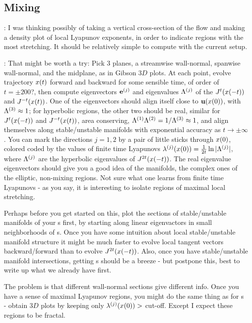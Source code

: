 \subsection{Mixing}
:
I was thinking possibly of taking a vertical cross-section of
the flow and making a density plot of local Lyapunov exponents,
in order to indicate regions with the most stretching.
It should be relatively simple to compute with the current setup.

\medskip
{}:
That might be worth a try: Pick 3 planes, a streamwise wall-normal,
spanwise wall-normal, and the midplane, as in Gibson $3D$ plots.
At each point, evolve trajectory $\ssp(t)$
forward and backward for some sensible time, of order of
$t=\pm 200$?, then compute eigenvectors
$\jEigvec[j]$ and eigenvalues $\ExpaEig^{(j)}$ of the {\jacobianM}
$\jMps^{t}(\ssp(-t))$ and $\jMps^{-t}(\ssp(t))$. One of the
eigenvectors should align itself close to $\bu(\ssp(0))$,
with $\ExpaEig^{(3)} \approx 1$; for hyperbolic regions, the other two should
be real, similar for $\jMps^{t}(\ssp(-t))$ and $\jMps^{-t}(\ssp(t))$,
area conserving,
$\ExpaEig^{(1)}\ExpaEig^{(2)}= 1/\ExpaEig^{(3)} \approx 1$,
and align themselves along stable/unstable manifolds with exponential
accuracy as $t \to \pm \infty$.
You can mark the directions $j=1,2$ by a pair of little sticks
through $\ssp(0)$, colored coded by the values of
finite time Lyapunovs
$\eigExp[j](\ssp(0)) = \frac{1}{2t} \ln |\ExpaEig^{(j)}|$, where
$\ExpaEig^{(j)}$ are the hyperbolic eigenvalues of
$\jMps^{2t}(\ssp(-t))$.
The real  eigenvalue eigenvectors should give you a good idea of
the manifolds, the complex ones of the elliptic, non-mixing regions.
Not sure what one learns from finite time Lyapunovs - as you say,
it is interesting to isolate regions of maximal local stretching.

Perhaps before you get started on this, plot the sections of stable/unstable
manifolds of your \stagp s first, by starting along linear eigenvactors
in small neighborhoods of \stagp s.
Once you have some intuition about local stable/unstable manifold structure
it might be much faster to evolve local tangent vectors backward/forward
than to evolve $\jMps^{2t}(\ssp(-t))$. Also, once you have
stable/unstable manifold intersections, getting \po s should be a breeze -
but postpone this, best to write up what we already have first.

The problem is that different wall-normal sections give different
info. Once you have a sense of maximal Lyapunov regions, you might
do the same thing as for \stagp s - obtain $3D$ plots by keeping only
$\eigExp[j](\ssp(0)) > $ cut-off. Except I expect these regions to
be fractal.

